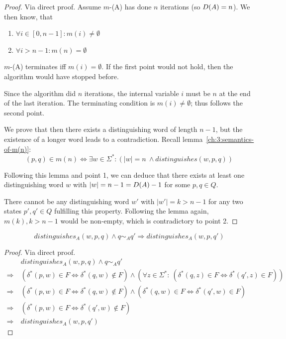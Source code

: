 \begin{proof}
	Via direct proof. Assume $m$-\CompDist(A) has done $n$ iterations (so $D(A) = n$). We then know, that
	\begin{enumerate}
		\item $\forall i \in [0,n-1]\colon m(i) \neq \emptyset$
		\item $\forall i > n-1\colon m(n)= \emptyset$ 
	\end{enumerate}
	$m$-\CompDist(A) terminates iff $m(i) = \emptyset$. If the first point would not hold, then the algorithm would have stopped before.
	
	Since the algorithm did $n$ iterations, the internal variable $i$ must be $n$ at the end of the last iteration. The terminating condition is $m(i) \neq \emptyset$; thus follows the second point.
    
    We prove that then there exists a distinguishing word of length $n-1$, but the existence of a longer word leads to a contradiction. Recall lemma~\ref{ch:3:semantics-of-m(n)}:
    \[
        (p,q) \in m(n) \Longleftrightarrow \exists w\in\Sigma^*\colon (|w| = n\ \land distinguishes(w, p, q))
    \]

	
	\noindent Following this lemma and point 1, we can deduce that there exists at least one distinguishing word $w$ with $|w| = n-1 = D(A)-1$ for some $p,q \in Q$.
	
	
	There cannot be any distinguishing word $w'$ with $|w'| = k > n-1$ for any two states $p',q'\in Q$ fulfilling this property. Following the lemma again, $m(k), k > n-1$ would be non-empty, which is contradictory to point 2.
\end{proof}

\begin{lemma}\label{ch:3:lem:disting-trans}
    \[
    distinguishes_A(w, p, q) \land q \sim_A q' \Rightarrow distinguishes_A(w, p, q')
    \]
\end{lemma}

\begin{proof}
    Via direct proof.
    \begin{align*}
        &\ distinguishes_A(w, p, q) \land q \sim_A q' \\
        \Rightarrow &\ (\delta^*(p,w) \in F \Leftrightarrow \delta^*(q,w) \notin F) \land (\forall z \in \Sigma^* \colon\ (\delta^*(q, z) \in F \Leftrightarrow \delta^*(q', z) \in F)) \\
        \Rightarrow &\ (\delta^*(p,w) \in F \Leftrightarrow \delta^*(q,w) \notin F) \land (\delta^*(q, w) \in F \Leftrightarrow \delta^*(q', w) \in F) \\
        \Rightarrow &\ (\delta^*(p,w) \in F \Leftrightarrow \delta^*(q',w) \notin F) \\
        \Rightarrow &\ distinguishes_A(w, p, q')
    \end{align*}
\end{proof}

